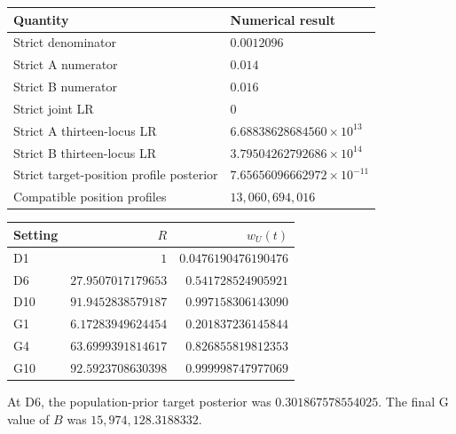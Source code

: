 \documentclass[
]{article}
\newcounter{none} %
\begin{document}
{\def\LTcaptype{none} %
\begin{longtable}[]{@{}
  >{\raggedright\arraybackslash}p{}
  >{\raggedleft\arraybackslash}p{}@{}}
\toprule\noalign{}
\begin{minipage}[b]{\linewidth}\raggedright
Quantity
\end{minipage} & \begin{minipage}[b]{\linewidth}\raggedleft
Numerical result
\end{minipage} \\
\midrule\noalign{}
\endhead
\bottomrule\noalign{}
\endlastfoot
Strict denominator & \(0.0012096\) \\
Strict A numerator & \(0.014\) \\
Strict B numerator & \(0.016\) \\
Strict joint LR & \(0\) \\
Strict A thirteen-locus LR & \(6.68838628684560\times10^{13}\) \\
Strict B thirteen-locus LR & \(3.79504262792686\times10^{14}\) \\
Strict target-position profile posterior &
\(7.65656096662972\times10^{-11}\) \\
Compatible position profiles & \(13{,}060{,}694{,}016\) \\
\end{longtable}
}

{\def\LTcaptype{none} %
\begin{longtable}[]{@{}lrr@{}}
\toprule\noalign{}
Setting & \(R\) & \(w_U(t)\) \\
\midrule\noalign{}
\endhead
\bottomrule\noalign{}
\endlastfoot
D1 & \(1\) & \(0.0476190476190476\) \\
D6 & \(27.9507017179653\) & \(0.541728524905921\) \\
D10 & \(91.9452838579187\) & \(0.997158306143090\) \\
G1 & \(6.17283949624454\) & \(0.201837236145844\) \\
G4 & \(63.6999391814617\) & \(0.826855819812353\) \\
G10 & \(92.5923708630398\) & \(0.999998747977069\) \\
\end{longtable}
}

At D6, the population-prior target posterior was \(0.301867578554025\).
The final G value of \(B\) was \(15{,}974{,}128.3188332\).
\end{document}
